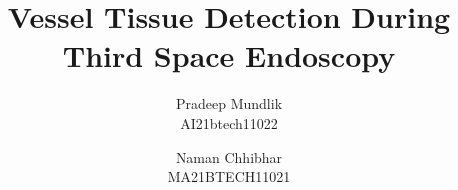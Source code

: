 \documentclass[10pt,twocolumn,letterpaper]{article}
\title{ Vessel Tissue Detection During Third Space Endoscopy}
\author{Pradeep Mundlik\\
AI21btech11022\\
\and
Naman Chhibhar\\
MA21BTECH11021\\
}
\begin{document}
\maketitle
    

% 
% 
{
    \small
    
    
}

% 
\end{document}

